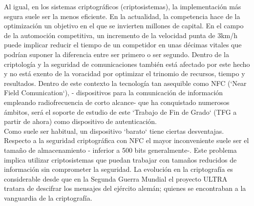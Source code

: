 \documentclass[../PFC.tex]{subfiles}
\begin{document}
Al igual, en los sistemas criptográficos (criptosistemas), la implementación más segura suele ser la menos eficiente. En la actualidad, la competencia  hace de la optimización un objetivo en el que se invierten millones de capital. En el campo de la automoción competitiva, un incremento de la velocidad punta de 3km/h puede implicar reducir el tiempo de un competidor en unas décimas vitales que podrían suponer la diferencia entre ser primero o ser segundo. Dentro de la criptología y la seguridad de comunicaciones también está afectado por este hecho y no está exento de la voracidad por optimizar el trinomio de recursos, tiempo y resultados. Dentro de este contexto la tecnología tan asequible como NFC (`Near Field Comunication`), - dispositivos para la comunicación de información empleando radiofrecuencia de corto alcance- que ha conquistado numerosos ámbitos, será el soporte de estudio de este `Trabajo de Fin de Grado` (TFG a partir de ahora) como dispositivo de autenticación.\\

Como suele ser habitual, un dispositivo `barato` tiene ciertas desventajas. Respecto a la seguridad criptográfica con NFC el mayor inconveniente suele ser el tamaño de almacenamiento - inferior a 500 bits generalmente-. Este problema implica utilizar criptosistemas que puedan trabajar con tamaños reducidos de información sin comprometer la seguridad. La evolución en la criptografía es considerable desde que en la Segunda Guerra Mundial el proyecto ULTRA tratara de descifrar los mensajes del ejército alemán; quienes se encontraban a la vanguardia de la criptografía. 
\\
\end{document}
